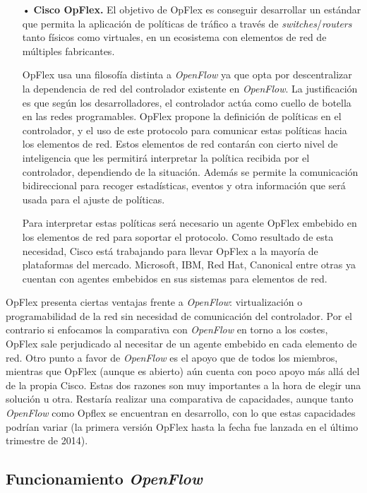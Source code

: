 \documentclass[a4paper,11pt]{book}
\begin{document}
\begin{itemize}
\label{opflex}
\item[•] \textbf{Cisco OpFlex.} El objetivo de OpFlex es conseguir desarrollar un estándar que permita la aplicación de políticas de tráfico a través de \textit{switches}/\textit{routers} tanto físicos como virtuales, en un ecosistema con elementos de red de múltiples fabricantes.

OpFlex usa una filosofía distinta a \emph{OpenFlow} ya que opta por descentralizar la dependencia de red del controlador existente en \emph{OpenFlow}. La justificación es que según los desarrolladores, el controlador actúa como cuello de botella en las redes programables. OpFlex propone la definición de políticas en el controlador, y el uso de este protocolo para comunicar estas políticas hacia los elementos de red. Estos elementos de red contarán con cierto nivel de inteligencia que les permitirá interpretar la política recibida por el controlador, dependiendo de la situación. Además se permite la comunicación bidireccional para recoger estadísticas, eventos y otra información que será usada para el ajuste de políticas.

Para interpretar estas políticas será necesario un agente OpFlex embebido en los elementos de red para soportar el protocolo. Como resultado de esta necesidad, Cisco está trabajando para llevar OpFlex a la mayoría de plataformas del mercado. Microsoft, IBM, Red Hat, Canonical entre otras ya cuentan con agentes embebidos en sus sistemas para elementos de red.

\end{itemize}

OpFlex presenta ciertas ventajas frente a \emph{OpenFlow}: virtualización o programabilidad de la red sin necesidad de comunicación del controlador. Por el contrario si enfocamos la comparativa con \emph{OpenFlow} en torno a los costes, OpFlex sale perjudicado al necesitar de un agente embebido en cada elemento de red. Otro punto a favor de \emph{OpenFlow} es el apoyo que de todos los miembros, mientras que OpFlex (aunque es abierto) aún cuenta con poco apoyo más allá del de la propia Cisco. Estas dos razones son muy importantes a la hora de elegir una solución u otra. Restaría realizar una comparativa de capacidades, aunque tanto \emph{OpenFlow} como Opflex se encuentran en desarrollo, con lo que estas capacidades podrían variar (la primera versión OpFlex hasta la fecha fue lanzada en el último trimestre de 2014).

\subsection{Funcionamiento \emph{OpenFlow}}
\end{document}
